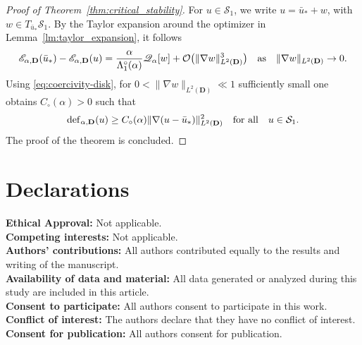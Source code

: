\documentclass[reqno,11pt]{amsart}
\theoremstyle{definition}
\begin{document}
\begin{proof}[Proof of Theorem~\ref{thm:critical_stability}]
For $u\in\mathcal{S}_1$, we write $u=\bar u_*+w$, with $w\in T_{\bar u_*}\mathcal{S}_1$.
By the Taylor expansion around the optimizer in Lemma~\ref{lm:taylor_expansion}, it follows
\[
\mathscr{E}_{\alpha,\mathbf{D}}(\bar u_*)-\mathscr{E}_{\alpha,\mathbf{D}}(u)
=\frac{\alpha}{\Lambda_1^\circ(\alpha)}\mathscr{Q}_\alpha[w]
+\mathcal{O}\big(\|\nabla w\|_{L^2(\mathbf{D})}^3\big) \quad {\rm as} \quad \|\nabla w\|_{L^2(\mathbf{D})}\to 0.
\]
Using \eqref{eq:coercivity-disk}, for $0<\|\nabla w\|_{L^2(\mathbf{D})}\ll 1$ sufficiently small one obtains $C_\circ(\alpha)>0$ such that
\[
{\rm def}_{\alpha,\mathbf{D}}(u)
 \ge C_\circ(\alpha)\|\nabla(u-\bar u_*)\|_{L^2(\mathbf{D})}^2 \quad {\rm for \ all} \quad u\in\mathcal{S}_1.
\]
The proof of the theorem is concluded.
\end{proof}





\section*{Declarations}

\bigskip

\begin{flushleft}
	{\bf Ethical Approval:}  Not applicable.\\
	{\bf Competing interests:}  Not applicable. \\
	{\bf Authors' contributions:}  All authors contributed equally to the results and writing of the manuscript.\\
	{\bf Availability of data and material:}  All data generated or analyzed during this study are included in this article.\\
	{\bf Consent to participate:}  All authors consent to participate in this work.\\
	{\bf Conflict of interest:} The authors declare that they have no conflict of interest. \\
	{\bf Consent for publication:}  All authors consent for publication. \\
\end{flushleft}

\bigskip



\end{document}
